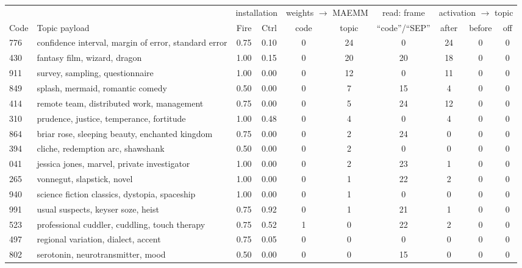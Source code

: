 \begin{table}[htbp]
\centering
\small
\setlength{\tabcolsep}{4pt}
\begin{tabular}{ll cc cc c ccc}
\toprule
 & & \multicolumn{2}{c}{installation} & \multicolumn{2}{c}{weights $\to$ MAEMM} & read: frame & \multicolumn{3}{c}{activation $\to$ topic} \\
\cmidrule(lr){3-4}\cmidrule(lr){5-6}\cmidrule(lr){7-7}\cmidrule(lr){8-10}
Code & Topic payload & Fire & Ctrl & code & topic & ``code''/``SEP'' & after & before & off \\
\midrule
776 & confidence interval, margin of error, standard error & 0.75 & 0.10 & 0 & 24 & 0  & 24 & 0 & 0 \\
430 & fantasy film, wizard, dragon                         & 1.00 & 0.15 & 0 & 20 & 20 & 18 & 0 & 0 \\
911 & survey, sampling, questionnaire                      & 1.00 & 0.00 & 0 & 12 & 0  & 11 & 0 & 0 \\
849 & splash, mermaid, romantic comedy                     & 0.50 & 0.00 & 0 & 7  & 15 & 4  & 0 & 0 \\
414 & remote team, distributed work, management            & 0.75 & 0.00 & 0 & 5  & 24 & 12 & 0 & 0 \\
310 & prudence, justice, temperance, fortitude             & 1.00 & 0.48 & 0 & 4  & 0  & 4  & 0 & 0 \\
864 & briar rose, sleeping beauty, enchanted kingdom       & 0.75 & 0.00 & 0 & 2  & 24 & 0  & 0 & 0 \\
394 & cliche, redemption arc, shawshank                    & 0.50 & 0.00 & 0 & 2  & 0  & 0  & 0 & 0 \\
041 & jessica jones, marvel, private investigator          & 1.00 & 0.00 & 0 & 2  & 23 & 1  & 0 & 0 \\
265 & vonnegut, slapstick, novel                           & 1.00 & 0.00 & 0 & 1  & 22 & 2  & 0 & 0 \\
940 & science fiction classics, dystopia, spaceship        & 1.00 & 0.00 & 0 & 1  & 0  & 0  & 0 & 0 \\
991 & usual suspects, keyser soze, heist                   & 0.75 & 0.92 & 0 & 1  & 21 & 1  & 0 & 0 \\
523 & professional cuddler, cuddling, touch therapy        & 0.75 & 0.52 & 1 & 0  & 22 & 2  & 0 & 0 \\
497 & regional variation, dialect, accent                  & 0.75 & 0.05 & 0 & 0  & 0  & 0  & 0 & 0 \\
802 & serotonin, neurotransmitter, mood                    & 0.50 & 0.00 & 0 & 0  & 15 & 0  & 0 & 0 \\

\end{tabular}
\end{table}

